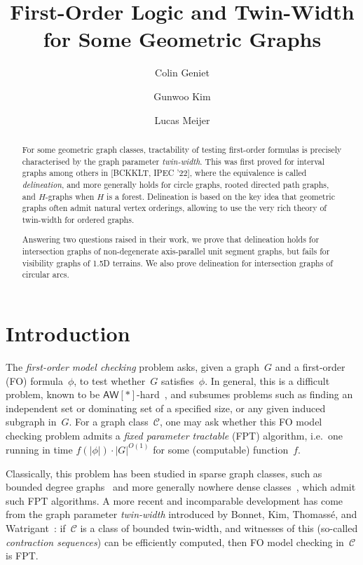 \documentclass[a4paper,UKenglish,cleveref,thm-restate]{lipics-v2021}
\title{First-Order Logic and Twin-Width for Some Geometric Graphs}
\author{Colin Geniet}{Discrete Mathematics Group, Institute for Basic Science (IBS), Daejeon, South Korea}{colin@ibs.re.kr}{https://orcid.org/0000-0003-4034-7634}{Supported by the Institute for Basic Science (IBS-R029-C1).}
\author{Gunwoo Kim}{School of Computing, KAIST, Daejeon, South Korea \and Discrete Mathematics Group, Institute for Basic Science (IBS), Daejeon, South Korea}{gunwoo.kim@kaist.ac.kr}{}{Supported by the Institute for Basic Science (IBS-R029-C1).}
\author{Lucas Meijer}{Department of Information and Computing Sciences, Utrecht University, The Netherlands}{l.meijer2@uu.nl}{https://orcid.org/0009-0002-4901-5249}{Supported by the Netherlands Organisation for Scientific Research (NWO) under project no. VI.Vidi.213.150.}
\theoremstyle{remark}
\newcommand{\Cc}{\mathcal{C}}
\newcommand{\aw}{\ensuremath{\mathsf{AW}[*]}\xspace}
\begin{document}
\maketitle

\begin{abstract}
    For some geometric graph classes, tractability of testing first-order formulas is precisely characterised by the graph parameter \emph{twin-width}.
    This was first proved for interval graphs among others in [BCKKLT, IPEC '22], where the equivalence is called \emph{delineation}, and more generally holds for circle graphs, rooted directed path graphs, and $H$-graphs when $H$ is a forest.
    Delineation is based on the key idea that geometric graphs often admit natural vertex orderings, allowing to use the very rich theory of twin-width for ordered graphs.
    
    Answering two questions raised in their work, we prove that delineation holds for intersection graphs of non-degenerate axis-parallel unit segment graphs, but fails for visibility graphs of 1.5D terrains.
    We also prove delineation for intersection graphs of circular arcs.
\end{abstract}



\section{Introduction}
The \emph{first-order model checking} problem asks, given a graph~$G$ and a first-order (FO) formula~$\phi$, to test whether~$G$ satisfies~$\phi$.
In general, this is a difficult problem, known to be \aw-hard~\cite{downey1996queries},
and subsumes problems such as finding an independent set or dominating set of a specified size, or any given induced subgraph in~$G$.
For a graph class~$\Cc$, one may ask whether this FO model checking problem admits a \emph{fixed parameter tractable} (FPT) algorithm,
i.e.\ one running in time $f(|\phi|) \cdot |G|^{O(1)}$ for some (computable) function~$f$.

Classically, this problem has been studied in sparse graph classes, such as bounded degree graphs~\cite{seese1996linear} and more generally nowhere dense classes~\cite{grohe2017deciding}, which admit such FPT algorithms.
A more recent and incomparable development has come from the graph parameter \emph{twin-width} introduced by Bonnet, Kim, Thomassé, and Watrigant~\cite{Bonnet2022twinwidth1}:
if~$\Cc$ is a class of bounded twin-width, and witnesses of this (so-called \emph{contraction sequences}) can be efficiently computed,
then FO model checking in~$\Cc$ is FPT.
\end{document}
